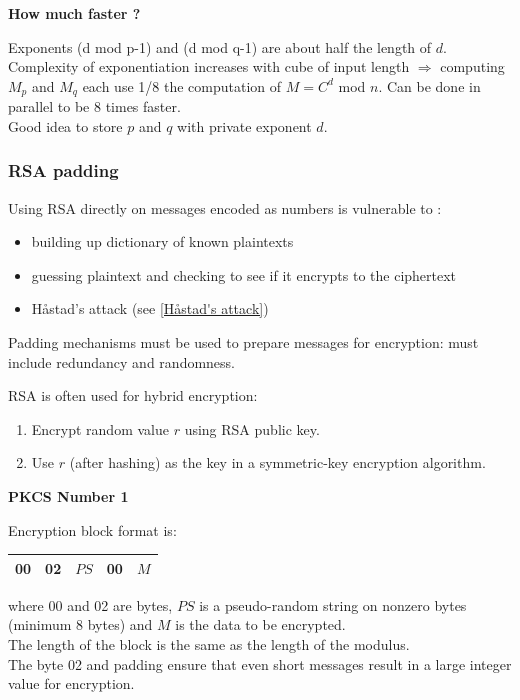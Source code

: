 \documentclass{article}
\begin{document}
\textbf{How much faster ?}

Exponents (d mod p-1) and (d mod q-1) are about half the length of $d$.\\
Complexity of exponentiation increases with cube of input length $\Rightarrow$ computing $M_p$ and $M_q$ each use 1/8 the computation of $M=C^d $ mod $n$. Can be done in parallel to be 8 times faster.\\
Good idea to store $p$ and $q$ with private exponent $d$.

\subsubsection{RSA padding}

Using RSA directly on messages encoded as numbers is vulnerable to :
\begin{itemize}
    \item building up dictionary of known plaintexts
    \item guessing plaintext and checking to see if it encrypts to the ciphertext
    \item Håstad's attack (see \ref{Håstad's attack})
\end{itemize}
Padding mechanisms must be used to prepare messages for encryption: must include redundancy and randomness.

RSA is often used for hybrid encryption:
\begin{enumerate}
    \item Encrypt random value $r$ using RSA public key.
    \item Use $r$ (after hashing) as the key in a symmetric-key encryption algorithm.
\end{enumerate}

\textbf{PKCS Number 1}

Encryption block format is:
\begin{center}
\begin{tabular}{ | c | c | c | c | c | } 
\hline
00 & 02 & $PS$ & 00 & $M$ \\
\hline
\end{tabular}
\end{center}
where 00 and 02 are bytes, $PS$ is a pseudo-random string on nonzero bytes (minimum 8 bytes) and $M$ is the data to be encrypted.\\
The length of the block is the same as the length of the modulus.\\
The byte 02 and padding ensure that even short messages result in a large integer value for encryption.
\end{document}
